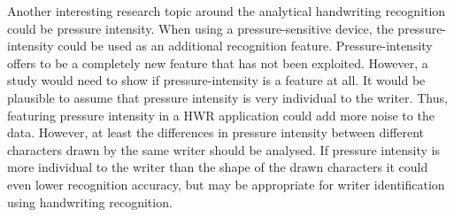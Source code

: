 Another interesting research topic around the analytical handwriting recognition
could be pressure intensity.  When using a pressure-sensitive device, 
the pressure-intensity could be used as an additional recognition feature. 
Pressure-intensity offers to be a completely new feature that has not been 
exploited. However, a study would need to show if pressure-intensity 
is a feature at all. It would be plausible to assume that pressure intensity is 
very individual to the writer. 
Thus, featuring pressure intensity in a HWR application could add more 
noise to the data. However, at least the differences in pressure intensity 
between different characters drawn by the same writer should be analysed.
If pressure intensity is more individual to the writer than the shape of the 
drawn characters it could even lower recognition accuracy, 
but may be appropriate for writer identification using handwriting recognition.




